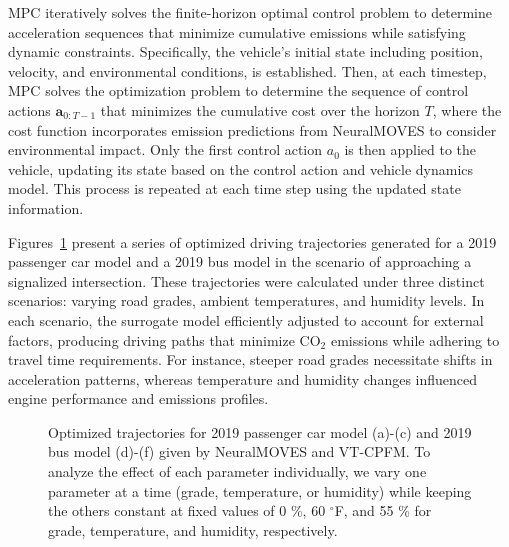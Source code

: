 \documentclass[12pt,english]{article}
\begin{document}
MPC iteratively solves the finite-horizon optimal control problem to determine acceleration sequences that minimize cumulative emissions while satisfying dynamic constraints. 
Specifically, the vehicle's initial state including position, velocity, and environmental conditions, is established. 
Then, at each timestep, MPC solves the optimization problem to determine the sequence of control actions \( \mathbf{a}_{0:T-1} \) that minimizes the cumulative cost over the horizon \( T \), where the cost function incorporates emission predictions from NeuralMOVES to consider environmental impact. Only the first control action \( a_0 \) is then applied to the vehicle, updating its state based on the control action and vehicle dynamics model. This process is repeated at each time step using the updated state information.




Figures~\ref{fig:car_bus} present a series of optimized driving trajectories generated for a 2019 passenger car model and a 2019 bus model in the scenario of approaching a signalized intersection. 
These trajectories were calculated under three distinct scenarios: varying road grades, ambient temperatures, and humidity levels. 
In each scenario, the surrogate model efficiently adjusted to account for external factors, producing driving paths that minimize CO$_2$ emissions while adhering to travel time requirements. 
For instance, steeper road grades necessitate shifts in acceleration patterns, whereas temperature and humidity changes influenced engine performance and emissions profiles.


\begin{figure}
    \centering
    \caption{Optimized trajectories for 2019 passenger car model (a)-(c) and 2019 bus model (d)-(f) given by NeuralMOVES and VT-CPFM. 
    To analyze the effect of each parameter individually, we vary one parameter at a time (grade, temperature, or humidity) while keeping the others constant at fixed values of 0 \%, 60 $^\circ$F, and 55 \% for grade, temperature, and humidity, respectively.}
    \label{fig:car_bus}
\end{figure}
\end{document}
